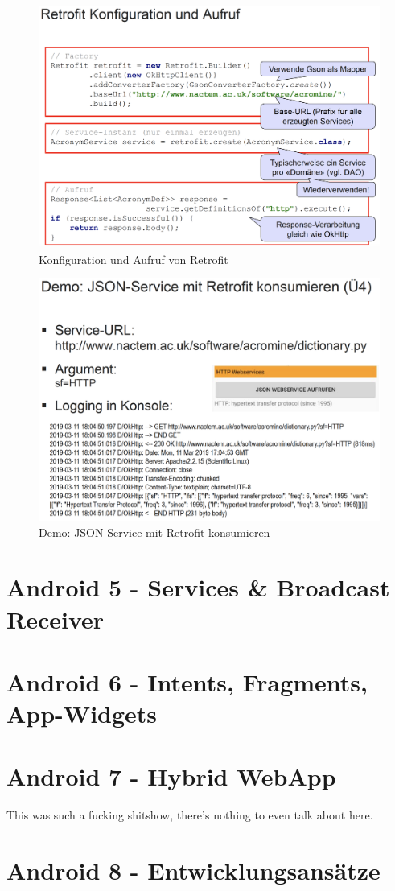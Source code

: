 \documentclass[a4paper]{article}
\begin{document}
	\newpage
	
	\begin{figure}[!htb]
		\centering
		\includegraphics[width=.95\textwidth]{img/retrofit_config.png}
		\caption{Konfiguration und Aufruf von Retrofit}
		\label{fig:retrofit_config}
	\end{figure}

	\begin{figure}[!htb]
		\centering
		\includegraphics[width=.95\textwidth]{img/retrofit_demo.png}
		\caption{Demo: JSON-Service mit Retrofit konsumieren}
		\label{fig:retrofit_demo}
	\end{figure}
		
\newpage
\section{Android 5 - Services \& Broadcast Receiver}


\newpage
\section{Android 6 - Intents, Fragments, App-Widgets}

	
\newpage
\section{Android 7 - Hybrid WebApp}

This was such a fucking shitshow, there's nothing to even talk about here.

\section{Android 8 - Entwicklungsansätze}

\end{document}
